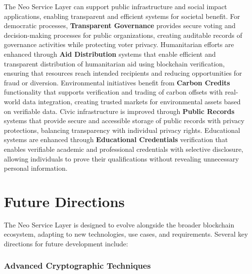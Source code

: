 \documentclass[11pt]{article}
\begin{document}
The Neo Service Layer can support public infrastructure and social impact applications, enabling transparent and efficient systems for societal benefit. For democratic processes, \textbf{Transparent Governance} provides secure voting and decision-making processes for public organizations, creating auditable records of governance activities while protecting voter privacy. Humanitarian efforts are enhanced through \textbf{Aid Distribution} systems that enable efficient and transparent distribution of humanitarian aid using blockchain verification, ensuring that resources reach intended recipients and reducing opportunities for fraud or diversion. Environmental initiatives benefit from \textbf{Carbon Credits} functionality that supports verification and trading of carbon offsets with real-world data integration, creating trusted markets for environmental assets based on verifiable data. Civic infrastructure is improved through \textbf{Public Records} systems that provide secure and accessible storage of public records with privacy protections, balancing transparency with individual privacy rights. Educational systems are enhanced through \textbf{Educational Credentials} verification that enables verifiable academic and professional credentials with selective disclosure, allowing individuals to prove their qualifications without revealing unnecessary personal information.

\section{Future Directions}
\label{subsec:nsl-future}

The Neo Service Layer is designed to evolve alongside the broader blockchain ecosystem, adapting to new technologies, use cases, and requirements. Several key directions for future development include:

\subsubsection{Advanced Cryptographic Techniques}
\label{subsubsec:advanced-crypto}
\end{document}
